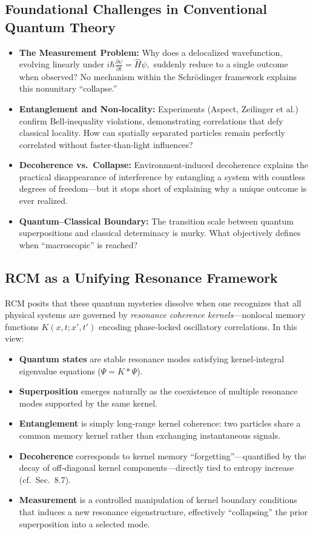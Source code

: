 \subsection{Foundational Challenges in Conventional Quantum Theory}

\begin{itemize}
  \item \textbf{The Measurement Problem:}  
    Why does a delocalized wavefunction, evolving linearly under 
    \(\displaystyle i\hbar\frac{\partial\psi}{\partial t} = \hat H\psi,\)
    suddenly reduce to a single outcome when observed?  No mechanism within the Schrödinger framework explains this nonunitary “collapse.”
  \item \textbf{Entanglement and Non‐locality:}  
    Experiments (Aspect, Zeilinger et al.) confirm Bell‐inequality violations, demonstrating correlations that defy classical locality.  How can spatially separated particles remain perfectly correlated without faster‐than‐light influences?
  \item \textbf{Decoherence vs.\ Collapse:}  
    Environment‐induced decoherence explains the practical disappearance of interference by entangling a system with countless degrees of freedom—but it stops short of explaining why a unique outcome is ever realized.
  \item \textbf{Quantum–Classical Boundary:}  
    The transition scale between quantum superpositions and classical determinacy is murky.  What objectively defines when “macroscopic” is reached?
\end{itemize}

\subsection{RCM as a Unifying Resonance Framework}

RCM posits that these quantum mysteries dissolve when one recognizes that all physical systems are governed by \emph{resonance coherence kernels}—nonlocal memory functions \(K(x,t;x',t')\) encoding phase‐locked oscillatory correlations.  In this view:

\begin{itemize}
  \item \textbf{Quantum states} are stable resonance modes satisfying kernel‐integral eigenvalue equations (\(\Psi=K\ast\Psi\)).  
  \item \textbf{Superposition} emerges naturally as the coexistence of multiple resonance modes supported by the same kernel.  
  \item \textbf{Entanglement} is simply long‐range kernel coherence: two particles share a common memory kernel rather than exchanging instantaneous signals.  
  \item \textbf{Decoherence} corresponds to kernel memory “forgetting”—quantified by the decay of off‐diagonal kernel components—directly tied to entropy increase (cf.\ Sec.~8.7).  
  \item \textbf{Measurement} is a controlled manipulation of kernel boundary conditions that induces a new resonance eigenstructure, effectively “collapsing” the prior superposition into a selected mode.
\end{itemize}

